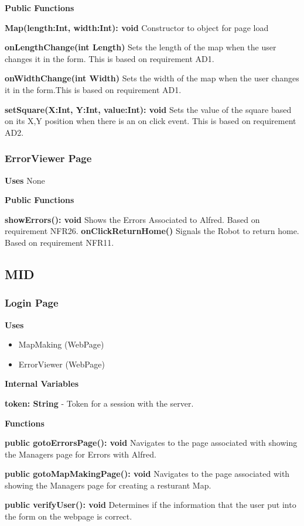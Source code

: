 \documentclass [10pt]{article}
\begin{document}
\textbf{Public Functions}

\textbf{ Map(length:Int, width:Int): void}
Constructor to object for page load

\textbf{onLengthChange(int Length)}
Sets the length of the map when the user changes it in the form. This is based on requirement AD1.

\textbf{onWidthChange(int Width)}
Sets the width of the map when the user changes it in the form.This is based on requirement AD1.

\textbf{setSquare(X:Int, Y:Int, value:Int): void}
Sets the value of the square based on its X,Y position when there is an on click event. This is based on requirement AD2.

\subsubsection{ErrorViewer Page}
\textbf{Uses}
None

\textbf{Public Functions}

\textbf{ showErrors(): void}
Shows the Errors Associated to Alfred. Based on requirement NFR26.
\textbf{onClickReturnHome()}
Signals the Robot to return home. Based on requirement NFR11.

\subsection{MID}

\subsubsection{Login Page}
\textbf{Uses}
\begin{itemize}
	\item MapMaking (WebPage)
	\item ErrorViewer (WebPage)
\end{itemize}


\textbf{Internal Variables}

\textbf{token: String} - Token for a session with the server.


\textbf{Functions}

\textbf{public gotoErrorsPage(): void}
Navigates to the page associated with showing the Managers page for Errors with Alfred.

\textbf{public gotoMapMakingPage(): void}
Navigates to the page associated with showing the Managers page for creating a resturant Map.

\textbf{public verifyUser(): void}
Determines if the information that the user put into the form on the webpage is correct.
\end{document}
